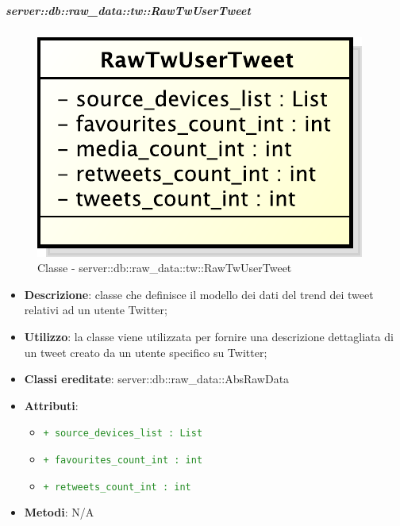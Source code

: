 		\subparagraph{server::db::raw\_data::tw::RawTwUserTweet} %
		\label{subp:server_db_raw_data_tw_rawtwusertweet}
			\begin{figure}[htbp]
				\centering
				\centerline{\includegraphics[scale=0.75]{./images/server/classes/db/raw_tw_user_tweet.pdf}}
				\caption{Classe - server::db::raw\_data::tw::RawTwUserTweet}
			\end{figure}
			\begin{itemize}
				\item \textbf{Descrizione}: classe che definisce il modello dei dati del trend dei tweet relativi ad un utente Twitter;
				\item \textbf{Utilizzo}: la classe viene utilizzata per fornire una descrizione dettagliata di un tweet creato da un utente specifico su Twitter;
				\item \textbf{Classi ereditate}: server::db::raw\_data::AbsRawData
				\item \textbf{Attributi}:
					\begin{itemize}
						\item \textcolor{forestgreen}{\texttt{+ source\_devices\_list : List}}
						\item \textcolor{forestgreen}{\texttt{+ favourites\_count\_int : int}}
						\item \textcolor{forestgreen}{\texttt{+ retweets\_count\_int : int}}
					\end{itemize}
				\item \textbf{Metodi}: N/A
			\end{itemize}


